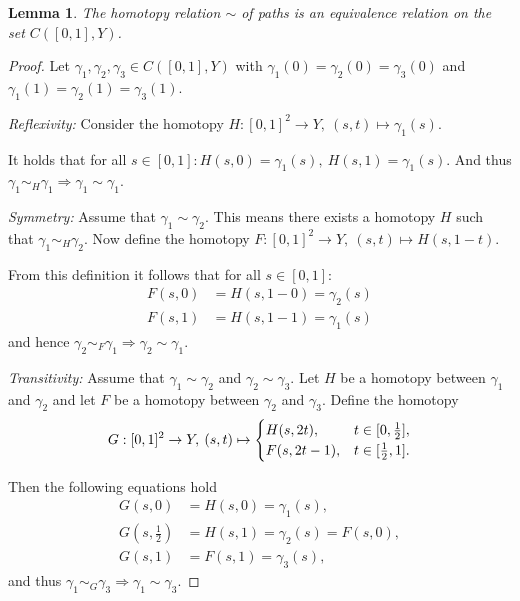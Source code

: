 \documentclass[a4paper, 11pt, twoside]{article}
\theoremstyle{break}
\theoremstyle{break}
\newtheorem{lemma}[thm]{Lemma}
\begin{document}
\begin{lemma} \label{lem:homotopy-equivalence}
  The homotopy relation $\sim$ of paths is an equivalence relation on the set $C([0,1],Y)$.
\end{lemma}

\begin{proof}
  Let $\gamma_1, \gamma_2, \gamma_3 \in C([0,1],Y)$ with $\gamma_1(0) = \gamma_2(0) = \gamma_3(0)$ and $\gamma_1(1) = \gamma_2(1) = \gamma_3(1)$.
  
  \textit{Reflexivity:}
  Consider the homotopy $H\colon [0,1]^2 \to Y, \: (s, t) \mapsto \gamma_1(s)$. 
  
  It holds that for all $s\in [0,1]\colon H(s, 0) = \gamma_1(s),\: H(s, 1) = \gamma_1(s)$. And thus $\gamma_1 \sim_H \gamma_1 \Rightarrow \gamma_1 \sim \gamma_1$.

  \textit{Symmetry:} 
  Assume that $\gamma_1 \sim \gamma_2$. This means there exists a homotopy $H$ such that $\gamma_1 \sim_H \gamma_2$. 
  Now define the homotopy $F\colon [0,1]^2 \to Y, \: (s, t) \mapsto H(s, 1-t)$. 
  
  From this definition it follows that for all $s \in [0,1]:$
  \begin{align*}
    F(s, 0) &= H(s, 1 - 0) = \gamma_2(s) \\
    F(s, 1) &= H(s, 1 - 1) = \gamma_1(s)
  \end{align*}
  and hence $\gamma_2 \sim_F \gamma_1 \Rightarrow \gamma_2 \sim \gamma_1$.

  \textit{Transitivity:}
  Assume that $\gamma_1 \sim \gamma_2$ and $\gamma_2 \sim \gamma_3$. Let $H$ be a homotopy between $\gamma_1$ and $\gamma_2$ and let $F$ be a homotopy between $\gamma_2$ and $\gamma_3$. 
  Define the homotopy
  \begin{equation*} 
    G: [0,1]^2 \to Y, \: (s,t) \mapsto \begin{cases}
      H(s, 2t), &t \in [0, {1 \over 2}], \\
      F(s, 2t - 1), &t \in [{1 \over 2}, 1].
    \end{cases}
  \end{equation*}

  Then the following equations hold
  \begin{align*}
    G(s,0) &= H(s,0) = \gamma_1(s), \\
    G\left(s, \tfrac{1}{2}\right) &= H(s, 1) = \gamma_2(s) = F(s, 0), \\
    G(s, 1) &= F(s, 1) = \gamma_3(s),
  \end{align*}
  and thus $\gamma_1 \sim_G \gamma_3 \Rightarrow \gamma_1 \sim \gamma_3$.
\end{proof}
\end{document}
